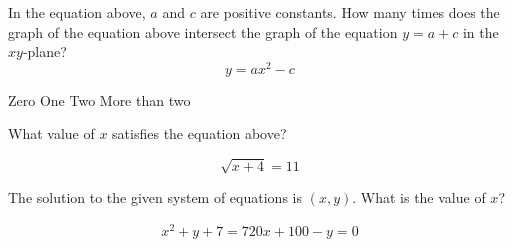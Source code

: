 \question[1]
In the equation above, $a$ and $c$ are positive constants. How many times does the graph of the equation above intersect the graph of the equation $y=a+c$ in the $x y$-plane?
\[
y=a x^{2}-c
\]
\begin{choices}
  \choice Zero
  \choice One
  \CorrectChoice Two
  \choice More than two
\end{choices}

\question[1]
What value of $x$ satisfies the equation above?

\[
\sqrt{x+4}=11
\]

\begin{solutionorbox}[1in]
\end{solutionorbox}

\question[1]
The solution to the given system of equations is $(x, y)$. What is the value of $x$?

\[
\begin{gathered}
x^{2}+y+7=7 
20 x+100-y=0
\end{gathered}
\]

\begin{solutionorbox}[1in]
\end{solutionorbox}


